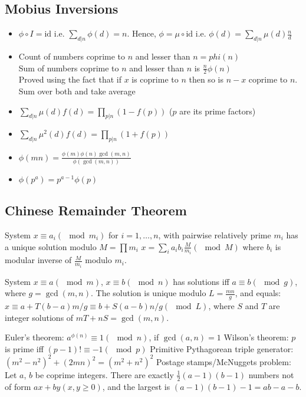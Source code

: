 \subsection{Mobius Inversions}

\begin{itemize}

\item $\phi \circ I = \text{id}$ i.e. $\sum_{d|n} \phi(d)=n$. Hence, $\phi = \mu \circ \text{id}$ i.e. $\phi(d)=\sum_{d|n} \mu(d) \frac{n}{d}$
\item Count of numbers coprime to $n$ and lesser than $n = phi(n)$ \\
    Sum of numbers coprime to $n$ and lesser than $n$  is $\frac{n}{2}\phi(n)$ \\
    Proved using the fact that if $x$ is coprime to $n$ then so is $n-x$ coprime to $n$. Sum over both and take average
\item $\sum_{d|n} \mu(d)f(d)=\prod_{p|n} (1 - f(p))$ ($p$ are its prime factors)
\item $\sum_{d|n} \mu^2(d)f(d)=\prod_{p|n} (1 + f(p))$
\item $\phi(mn) = \frac{\phi(m)\phi(n)\gcd(m,n)}{\phi(\gcd(m,n))}$
\item $\phi(p^a) = p^{a-1}\phi{(p)}$
\end{itemize}

\subsection{Chinese Remainder Theorem}

System $x \equiv a_i(\mod m_i)$ for $i = 1, \ldots, n$, with pairwise relatively prime $m_i$ has a unique solution modulo $M = \prod m_i$
$x=\sum_{i} a_ib_i\frac M{m_i} (\mod M)$ where $b_i$ is modular inverse of $\frac M{m_i}$ modulo $m_i$.

System $x \equiv a (\mod m)$, $x \equiv b (\mod n)$ has solutions iff $a \equiv b (\mod g)$, where $g = \gcd(m, n)$. The
solution is unique modulo $L = \frac{mn}{g}$, and equals: $x \equiv a + T (b − a)m/g \equiv b + S(a − b)n/g (\mod L)$,
where $S$ and $T$ are integer solutions of $mT + nS = \gcd(m, n)$.

Euler's theorem: $a^{\phi(n)}\equiv 1(\mod n)$, if $\gcd(a,n)=1$
Wilson's theorem: $p$ is prime iff $(p-1)! \equiv -1(\mod p)$
Primitive Pythagorean triple generator: $(m^2-n^2)^2 + (2mn)^2 = (m^2+n^2)^2$
Postage stamps/McNuggets problem: Let $a$, $b$ be coprime integers. There are exactly $\frac 12(a−1)(b−1)$ numbers not of form $ax+by (x, y \geq 0)$, and the largest is $(a−1)(b−1)−1 = ab−a−b$.

